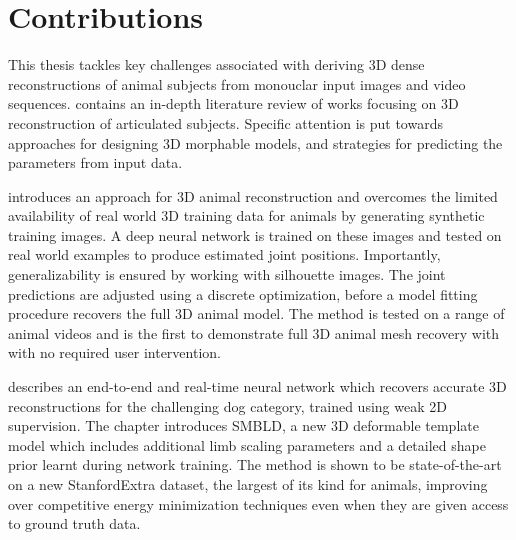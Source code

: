 



\section{Contributions}  %
This thesis tackles key challenges associated with deriving 3D dense reconstructions of animal subjects from monouclar input images and video sequences.  contains an in-depth literature review of works focusing on 3D reconstruction of articulated subjects. Specific attention is put towards approaches for designing 3D morphable models, and strategies for predicting the parameters from input data. 

 introduces an approach for 3D animal reconstruction and overcomes the limited availability of real world 3D training data for animals by generating synthetic training images. A deep neural network is trained on these images and tested on real world examples to produce estimated joint positions. Importantly, generalizability is ensured by working with silhouette images. The joint predictions are adjusted using a discrete optimization, before a model fitting procedure recovers the full 3D animal model. The method is tested on a range of animal videos and is the first to demonstrate full 3D animal mesh recovery with with no required user intervention. 

 describes an end-to-end and real-time neural network which recovers accurate 3D reconstructions for the challenging dog category, trained using weak 2D supervision. The chapter introduces SMBLD, a new 3D deformable template model which includes additional limb scaling parameters and a detailed shape prior learnt during network training. The method is shown to be state-of-the-art on a new StanfordExtra dataset, the largest of its kind for animals, improving over competitive energy minimization techniques even when they are given access to ground truth data. 

